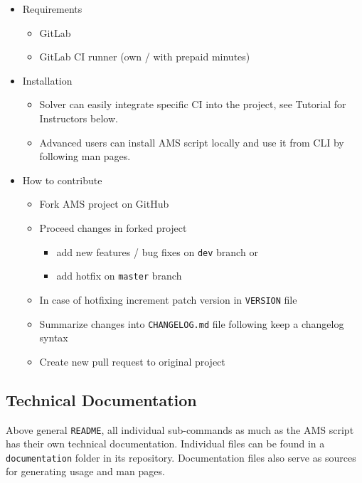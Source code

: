\begin{itemize}
\item
  {Requirements}
  \begin{itemize}
  \item
    {GitLab}
  \item
    {GitLab CI runner (own / with prepaid minutes)}
  \end{itemize}

\item
  {Installation}
  \begin{itemize}
  \item
    {Solver can easily integrate specific CI into the project, see Tutorial for Instructors below.}
  \item
    {Advanced users can install AMS script locally and use it from CLI by following man pages.}
  \end{itemize}

\item
  {How to contribute}
  \begin{itemize}
  \item
    {Fork AMS project on GitHub}
  \item
    {Proceed changes in forked project}
    \begin{itemize}
    \item
      {add new features / bug fixes on \texttt{dev} branch or}
    \item
      {add hotfix on \texttt{master} branch}
    \end{itemize}
  \item
    {In case of hotfixing increment patch version in \texttt{VERSION} file}
  \item
    {Summarize changes into \texttt{CHANGELOG.md} file following keep a changelog syntax}
  \item
    {Create new pull request to original project}
  \end{itemize}
\end{itemize}

\subsection{Technical Documentation}\label{ssec:techdoc}

{Above general \texttt{README}, all individual sub-commands as much as the AMS script has their own technical documentation. Individual files can be found in a \texttt{documenta\-tion} folder in its repository. Documentation files also serve as sources for generating usage and man pages.}

